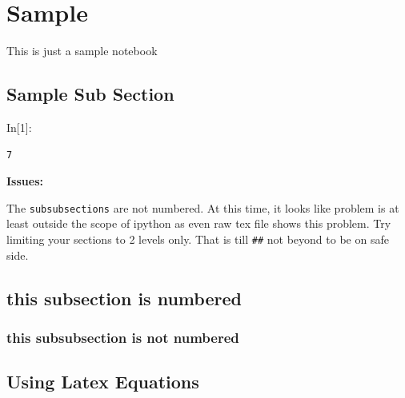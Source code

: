 \documentclass[float=false,crop=false]{standalone}
\begin{document}
    
    
    \maketitle
    
    

    
    \section{Sample}\label{sample}

This is just a sample notebook

\subsection{Sample Sub Section}\label{sample-sub-section}

   \begin{InVerbatim}[commandchars=\\\{\},fontsize=\scriptsize]
{\color{incolor}In[{\color{incolor}1}]:} 
\end{InVerbatim}

    \begin{Verbatim}[commandchars=\\\{\},fontsize=\footnotesize]
7

    \end{Verbatim}

    \textbf{Issues:}

The \texttt{subsubsections} are not numbered. At this time, it looks
like problem is at least outside the scope of ipython as even raw tex
file shows this problem. Try limiting your sections to 2 levels only.
That is till \texttt{\#\#} not beyond to be on safe side.

\subsection{this subsection is
numbered}\label{this-subsection-is-numbered}

\subsubsection{this subsubsection is not
numbered}\label{this-subsubsection-is-not-numbered}

    \subsection{Using Latex Equations}\label{using-latex-equations}
\end{document}
